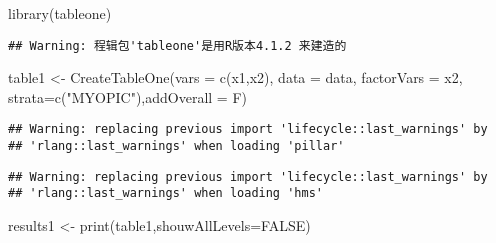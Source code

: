 \documentclass[]{ctexbook}
\newenvironment{Shaded}{\begin{snugshade}}{\end{snugshade}}
\newcommand{\AttributeTok}[1]{\textcolor[rgb]{0.77,0.63,0.00}{#1}}
\newcommand{\ConstantTok}[1]{\textcolor[rgb]{0.00,0.00,0.00}{#1}}
\newcommand{\FunctionTok}[1]{\textcolor[rgb]{0.00,0.00,0.00}{#1}}
\newcommand{\NormalTok}[1]{#1}
\newcommand{\OtherTok}[1]{\textcolor[rgb]{0.56,0.35,0.01}{#1}}
\newcommand{\StringTok}[1]{\textcolor[rgb]{0.31,0.60,0.02}{#1}}
\begin{document}
\begin{Shaded}
\begin{Highlighting}[]
\FunctionTok{library}\NormalTok{(tableone)}
\end{Highlighting}
\end{Shaded}

\begin{verbatim}
## Warning: 程辑包'tableone'是用R版本4.1.2 来建造的
\end{verbatim}

\begin{Shaded}
\begin{Highlighting}[]
\NormalTok{table1 }\OtherTok{\textless{}{-}} \FunctionTok{CreateTableOne}\NormalTok{(}\AttributeTok{vars =} \FunctionTok{c}\NormalTok{(x1,x2),}
                       \AttributeTok{data =}\NormalTok{ data,}
                       \AttributeTok{factorVars =}\NormalTok{ x2,}
                       \AttributeTok{strata=}\FunctionTok{c}\NormalTok{(}\StringTok{"MYOPIC"}\NormalTok{),}\AttributeTok{addOverall =}\NormalTok{ F)}
\end{Highlighting}
\end{Shaded}

\begin{verbatim}
## Warning: replacing previous import 'lifecycle::last_warnings' by
## 'rlang::last_warnings' when loading 'pillar'
\end{verbatim}

\begin{verbatim}
## Warning: replacing previous import 'lifecycle::last_warnings' by
## 'rlang::last_warnings' when loading 'hms'
\end{verbatim}

\begin{Shaded}
\begin{Highlighting}[]
\NormalTok{results1 }\OtherTok{\textless{}{-}} \FunctionTok{print}\NormalTok{(table1,}\AttributeTok{shouwAllLevels=}\ConstantTok{FALSE}\NormalTok{)}
\end{Highlighting}
\end{Shaded}
\end{document}
